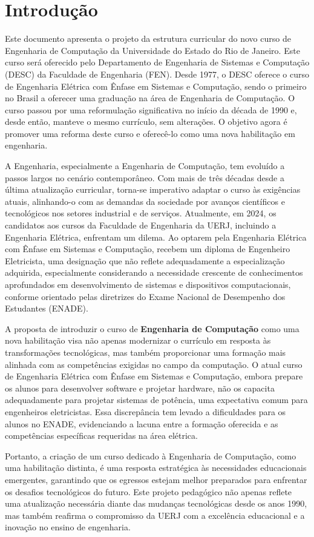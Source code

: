 \chapter{Introdução}
\label{intro} %

Este documento apresenta o projeto da estrutura curricular do novo curso de Engenharia de Computação da Universidade do Estado do Rio de Janeiro. Este curso será oferecido pelo Departamento de Engenharia de Sistemas e Computação (DESC) da Faculdade de Engenharia (FEN). Desde 1977, o DESC oferece o curso de Engenharia Elétrica com Ênfase em Sistemas e Computação, sendo o primeiro no Brasil a oferecer uma graduação na área de Engenharia de Computação. O curso passou por uma reformulação significativa no início da década de 1990 e, desde então, manteve o mesmo currículo, sem alterações. O objetivo agora é promover uma reforma deste curso e oferecê-lo como uma nova habilitação em engenharia.

A Engenharia, especialmente a Engenharia de Computação, tem evoluído a passos largos no cenário contemporâneo. Com mais de três décadas desde a última atualização curricular, torna-se imperativo adaptar o curso às exigências atuais, alinhando-o com as demandas da sociedade por avanços científicos e tecnológicos nos setores industrial e de serviços. Atualmente, em 2024, os candidatos aos cursos da Faculdade de Engenharia da UERJ, incluindo a Engenharia Elétrica, enfrentam um dilema. Ao optarem pela Engenharia Elétrica com Ênfase em Sistemas e Computação, recebem um diploma de Engenheiro Eletricista, uma designação que não reflete adequadamente a especialização adquirida, especialmente considerando a necessidade crescente de conhecimentos aprofundados em desenvolvimento de sistemas e dispositivos computacionais, conforme orientado pelas diretrizes do Exame Nacional de Desempenho dos Estudantes (ENADE).

A proposta de introduzir o curso de \textbf{Engenharia de Computação} como uma nova habilitação visa não apenas modernizar o currículo em resposta às transformações tecnológicas, mas também proporcionar uma formação mais alinhada com as competências exigidas no campo da computação. O atual curso de Engenharia Elétrica com Ênfase em Sistemas e Computação, embora prepare os alunos para desenvolver software e projetar hardware, não os capacita adequadamente para projetar sistemas de potência, uma expectativa comum para engenheiros eletricistas. Essa discrepância tem levado a dificuldades para os alunos no ENADE, evidenciando a lacuna entre a formação oferecida e as competências específicas requeridas na área elétrica.

Portanto, a criação de um curso dedicado à Engenharia de Computação, como uma habilitação distinta, é uma resposta estratégica às necessidades educacionais emergentes, garantindo que os egressos estejam melhor preparados para enfrentar os desafios tecnológicos do futuro. Este projeto pedagógico não apenas reflete uma atualização necessária diante das mudanças tecnológicas desde os anos 1990, mas também reafirma o compromisso da UERJ com a excelência educacional e a inovação no ensino de engenharia.